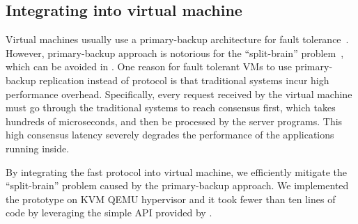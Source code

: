 \subsection{Integrating \xxx into virtual machine} \label{sec:overhead}
Virtual machines usually use a primary-backup architecture for fault 
tolerance~\cite{alsberg1976principle}. However, primary-backup approach is 
notorious for the ``split-brain'' problem~\cite{scales2010design}, which can be 
avoided in \paxos. One reason for fault tolerant VMs to use 
primary-backup replication instead of \paxos protocol is that traditional \paxos 
systems incur high performance overhead. Specifically, every 
request received by the virtual machine must go through the traditional \paxos 
systems to reach consensus first, which takes hundreds of microseconds, and then 
be processed by the server programs. This high consensus latency severely 
degrades the performance of the applications running inside.

By integrating the fast \xxx \paxos protocol into virtual machine, we 
efficiently mitigate the ``split-brain'' problem caused by the primary-backup 
approach. We implemented the prototype on KVM QEMU hypervisor and it took fewer 
than ten lines of code by leveraging the simple API provided by \xxx.
